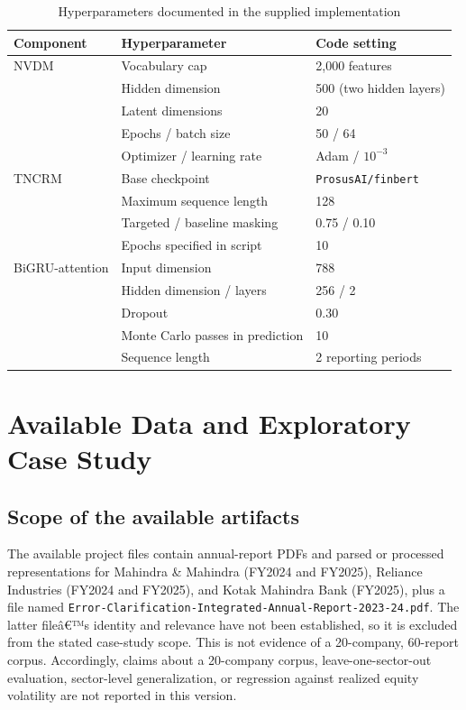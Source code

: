\documentclass[pdflatex,sn-basic,Numbered]{sn-jnl}
\begin{document}
\begin{table}[h]
\centering
\caption{Hyperparameters documented in the supplied implementation}
\label{tab:hyperparams}
\begin{tabular}{lll}
\toprule
\textbf{Component} & \textbf{Hyperparameter} & \textbf{Code setting} \\
\midrule
NVDM & Vocabulary cap & 2,000 features \\
& Hidden dimension & 500 (two hidden layers) \\
& Latent dimensions & 20 \\
& Epochs / batch size & 50 / 64 \\
& Optimizer / learning rate & Adam / $10^{-3}$ \\
\midrule
TNCRM & Base checkpoint & \texttt{ProsusAI/finbert} \\
& Maximum sequence length & 128 \\
& Targeted / baseline masking & 0.75 / 0.10 \\
& Epochs specified in script & 10 \\
\midrule
BiGRU-attention & Input dimension & 788 \\
& Hidden dimension / layers & 256 / 2 \\
& Dropout & 0.30 \\
& Monte Carlo passes in prediction & 10 \\
& Sequence length & 2 reporting periods \\
\bottomrule
\end{tabular}
\end{table}

\section{Available Data and Exploratory Case Study}
\label{sec:case-study}

\subsection{Scope of the available artifacts}
The available project files contain annual-report PDFs and parsed or processed representations for Mahindra \& Mahindra (FY2024 and FY2025), Reliance Industries (FY2024 and FY2025), and Kotak Mahindra Bank (FY2025), plus a file named \texttt{Error-Clarification-Integrated-Annual-Report-2023-24.pdf}. The latter fileâ€™s identity and relevance have not been established, so it is excluded from the stated case-study scope. This is not evidence of a 20-company, 60-report corpus. Accordingly, claims about a 20-company corpus, leave-one-sector-out evaluation, sector-level generalization, or regression against realized equity volatility are not reported in this version.
\end{document}
